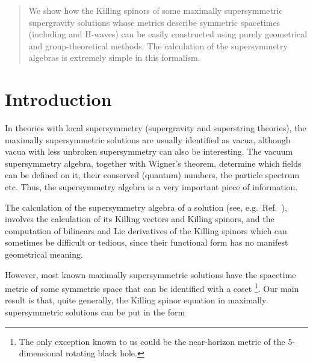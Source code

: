 \documentclass[12pt,a4paper]{article}
\begin{document}
\begin{quotation}

\small

We show how the Killing spinors of some maximally supersymmetric
supergravity solutions whose metrics describe symmetric spacetimes
(including \coordHE{} and H\coordHE{}-waves) can be easily
constructed using purely geometrical and group-theoretical methods.
The calculation of the supersymmetry algebras is extremely simple in
this formalism.

\end{quotation}

\newpage

\pagestyle{plain}


\section*{Introduction}

In theories with local supersymmetry (supergravity and superstring
theories), the maximally supersymmetric solutions are usually
identified as vacua, although vacua with less unbroken supersymmetry
can also be interesting. The vacuum supersymmetry algebra, together
with Wigner's theorem, determine which fields can be defined on it,
their conserved (quantum) numbers, the particle spectrum etc. Thus,
the supersymmetry algebra is a very important piece of information.

The calculation of the supersymmetry algebra of a solution (see,
e.g.~Ref.~\cite{Figueroa-O'Farrill:1999va}), involves the calculation
of its Killing vectors and Killing spinors, and the computation of
bilinears and Lie derivatives of the Killing spinors which can
sometimes be difficult or tedious, since their functional form has no
manifest geometrical meaning.

However, most known maximally supersymmetric solutions have the
spacetime metric of some symmetric space that can be identified with a
coset \coordHE{}\footnote{The only exception known to us could be the
  near-horizon metric of the 5-dimensional rotating black hole.}.  Our
main result is that, quite generally, the Killing spinor equation in
maximally supersymmetric solutions can be put in the form
\end{document}
